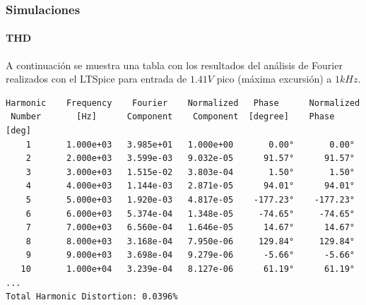 \documentclass[a4paper,12pt,twoside]{article}
\begin{document}



\subsubsection{Simulaciones}


\paragraph{THD} A continuación se muestra una tabla con los resultados del análisis de Fourier realizados con el LTSpice para entrada de $1.41V$ pico (máxima excursión) a $1kHz$. 




\begin{verbatim}
Harmonic	Frequency	 Fourier 	Normalized	 Phase  	Normalized
 Number 	  [Hz]   	Component	 Component	[degree]	Phase [deg]
    1   	1.000e+03	3.985e+01	1.000e+00	    0.00°	    0.00°
    2   	2.000e+03	3.599e-03	9.032e-05	   91.57°	   91.57°
    3   	3.000e+03	1.515e-02	3.803e-04	    1.50°	    1.50°
    4   	4.000e+03	1.144e-03	2.871e-05	   94.01°	   94.01°
    5   	5.000e+03	1.920e-03	4.817e-05	 -177.23°	 -177.23°
    6   	6.000e+03	5.374e-04	1.348e-05	  -74.65°	  -74.65°
    7   	7.000e+03	6.560e-04	1.646e-05	   14.67°	   14.67°
    8   	8.000e+03	3.168e-04	7.950e-06	  129.84°	  129.84°
    9   	9.000e+03	3.698e-04	9.279e-06	   -5.66°	   -5.66°
   10   	1.000e+04	3.239e-04	8.127e-06	   61.19°	   61.19°
...
Total Harmonic Distortion: 0.0396%


\end{verbatim}
\end{document}
